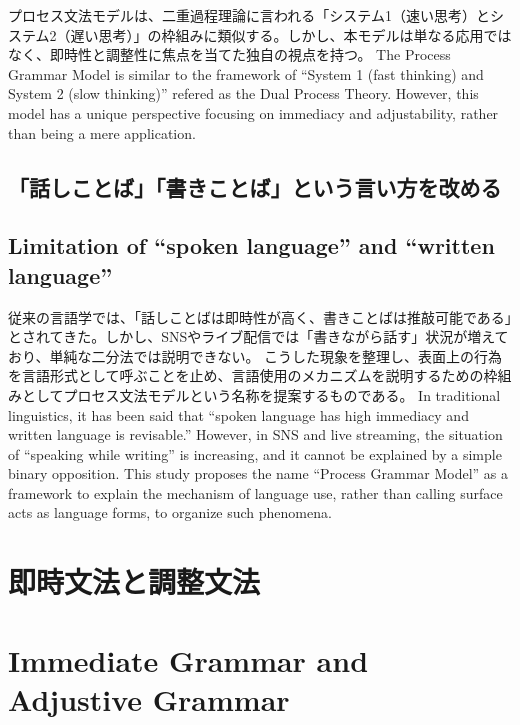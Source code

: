 \documentclass[a4paper,xelatex,ja=standard]{bxjsarticle}
\begin{document}
\ifJPN
プロセス文法モデルは、二重過程理論に言われる「システム1（速い思考）とシステム2（遅い思考）」の枠組みに類似する。しかし、本モデルは単なる応用ではなく、即時性と調整性に焦点を当てた独自の視点を持つ\autocite{Evans2008, Kahneman2011-KAHTFA-2,squire2009memory}。
\else
The Process Grammar Model is similar to the framework of ``System 1 (fast thinking) and System 2 (slow thinking)'' refered as the Dual Process Theory. However, this model has a unique perspective focusing on immediacy and adjustability, rather than being a mere application.\autocite{Evans2008, Kahneman2011-KAHTFA-2,squire2009memory}
\fi

\ifJPN
  \subsection{「話しことば」「書きことば」という言い方を改める}
\else
  \subsection{Limitation of ``spoken language'' and ``written language''}
\fi

\ifJPN
従来の言語学では、「話しことばは即時性が高く、書きことばは推敲可能である」とされてきた。しかし、SNSやライブ配信では「書きながら話す」状況が増えており、単純な二分法では説明できない。
こうした現象を整理し、表面上の行為を言語形式として呼ぶことを止め、言語使用のメカニズムを説明するための枠組みとしてプロセス文法モデルという名称を提案するものである。
\else
In traditional linguistics, it has been said that ``spoken language has high immediacy and written language is revisable.'' However, in SNS and live streaming, the situation of ``speaking while writing'' is increasing, and it cannot be explained by a simple binary opposition.
This study proposes the name ``Process Grammar Model'' as a framework to explain the mechanism of language use, rather than calling surface acts as language forms, to organize such phenomena.
\fi

\ifJPN
  \section{即時文法と調整文法}
\else
  \section{Immediate Grammar and Adjustive Grammar}
\fi
\end{document}
